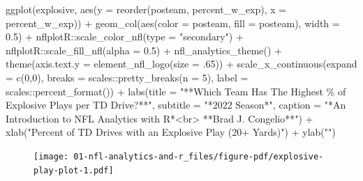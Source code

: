 \documentclass[
  letterpaper,
]{krantz}
\newenvironment{Shaded}{\begin{snugshade}}{\end{snugshade}}
\newcommand{\AttributeTok}[1]{\textcolor[rgb]{0.40,0.45,0.13}{#1}}
\newcommand{\DecValTok}[1]{\textcolor[rgb]{0.68,0.00,0.00}{#1}}
\newcommand{\FloatTok}[1]{\textcolor[rgb]{0.68,0.00,0.00}{#1}}
\newcommand{\FunctionTok}[1]{\textcolor[rgb]{0.28,0.35,0.67}{#1}}
\newcommand{\NormalTok}[1]{\textcolor[rgb]{0.00,0.23,0.31}{#1}}
\newcommand{\SpecialCharTok}[1]{\textcolor[rgb]{0.37,0.37,0.37}{#1}}
\newcommand{\StringTok}[1]{\textcolor[rgb]{0.13,0.47,0.30}{#1}}
\begin{document}
\begin{Shaded}
\begin{Highlighting}[]
\FunctionTok{ggplot}\NormalTok{(explosive, }\FunctionTok{aes}\NormalTok{(}\AttributeTok{y =} \FunctionTok{reorder}\NormalTok{(posteam, percent\_w\_exp),}
                      \AttributeTok{x =}\NormalTok{ percent\_w\_exp)) }\SpecialCharTok{+}
  \FunctionTok{geom\_col}\NormalTok{(}\FunctionTok{aes}\NormalTok{(}\AttributeTok{color =}\NormalTok{ posteam, }\AttributeTok{fill =}\NormalTok{ posteam), }\AttributeTok{width =} \FloatTok{0.5}\NormalTok{) }\SpecialCharTok{+}
\NormalTok{  nflplotR}\SpecialCharTok{::}\FunctionTok{scale\_color\_nfl}\NormalTok{(}\AttributeTok{type =} \StringTok{"secondary"}\NormalTok{) }\SpecialCharTok{+}
\NormalTok{  nflplotR}\SpecialCharTok{::}\FunctionTok{scale\_fill\_nfl}\NormalTok{(}\AttributeTok{alpha =} \FloatTok{0.5}\NormalTok{) }\SpecialCharTok{+}
  \FunctionTok{nfl\_analytics\_theme}\NormalTok{() }\SpecialCharTok{+}
  \FunctionTok{theme}\NormalTok{(}\AttributeTok{axis.text.y =} \FunctionTok{element\_nfl\_logo}\NormalTok{(}\AttributeTok{size =}\NormalTok{ .}\DecValTok{65}\NormalTok{)) }\SpecialCharTok{+}
  \FunctionTok{scale\_x\_continuous}\NormalTok{(}\AttributeTok{expand =} \FunctionTok{c}\NormalTok{(}\DecValTok{0}\NormalTok{,}\DecValTok{0}\NormalTok{),}
                     \AttributeTok{breaks =}\NormalTok{ scales}\SpecialCharTok{::}\FunctionTok{pretty\_breaks}\NormalTok{(}\AttributeTok{n =} \DecValTok{5}\NormalTok{),}
                     \AttributeTok{label =}\NormalTok{ scales}\SpecialCharTok{::}\FunctionTok{percent\_format}\NormalTok{()) }\SpecialCharTok{+}
  \FunctionTok{labs}\NormalTok{(}\AttributeTok{title =} \StringTok{"**Which Team Has The Highest \% of}
\StringTok{       Explosive Plays per TD Drive?**"}\NormalTok{,}
       \AttributeTok{subtitle =} \StringTok{"*2022 Season*"}\NormalTok{,}
       \AttributeTok{caption =} \StringTok{"*An Introduction to NFL Analytics with R*\textless{}br\textgreater{}}
\StringTok{       **Brad J. Congelio**"}\NormalTok{) }\SpecialCharTok{+}
  \FunctionTok{xlab}\NormalTok{(}\StringTok{"Percent of TD Drives with an Explosive Play (20+ Yards)"}\NormalTok{) }\SpecialCharTok{+}
  \FunctionTok{ylab}\NormalTok{(}\StringTok{""}\NormalTok{)}
\end{Highlighting}
\end{Shaded}

\begin{figure}[H]

{\centering \texttt{[image: 01-nfl-analytics-and-r\_files/figure-pdf/explosive-play-plot-1.pdf]}

}

\end{figure}
\end{document}

